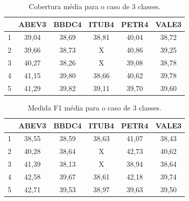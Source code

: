 \documentclass[grad,numbers]{coppe}
\begin{document}
 			\begin{table}[h]
 				\caption{Cobertura média para o caso de 3 classes.}
 				\label{tab:3c_co_analysis}
 				\centering
 				{\footnotesize
 					\begin{tabular}{|c|c|c|c|c|c|}
 						\hline
 						\diagbox[linewidth=0.2pt, width=\dimexpr \textwidth/10+2\tabcolsep\relax, height=0.8cm]{Dias}{Ativo}
 						& ABEV3 & BBDC4 & ITUB4 & PETR4 & VALE3\\
 						\hline
 						1 & 39,04 & 38,69 & 38,81 & 40,04 & 38,72 \\
 						2 & 39,66 & 38,73 & X     & 40,86 & 39,25 \\
 						3 & 40,27 & 38,26 & X     & 39,08 & 38,78 \\
 						4 & 41,15 & 39,80 & 38,66 & 40,62 & 39,78 \\
 						5 & 41,29 & 39,82 & 39,11 & 39,70 & 39,60 \\
 						\hline
 				\end{tabular}}
 			\end{table}
 			\begin{table}[h]
 				\caption{Medida F1 média para o caso de 3 classes.}
 				\label{tab:3c_f1_analysis}
 				\centering
 				{\footnotesize
 					\begin{tabular}{|c|c|c|c|c|c|}
 						\hline
 						\diagbox[linewidth=0.2pt, width=\dimexpr \textwidth/10+2\tabcolsep\relax, height=0.8cm]{Dias}{Ativo}
 						& ABEV3 & BBDC4 & ITUB4 & PETR4 & VALE3\\
 						\hline
 						1 & 38,55 & 38,59 & 38,63 & 41,07 & 38,43 \\
 						2 & 40,28 & 38,64 & X     & 42,73 & 40,62 \\
 						3 & 41,39 & 38,13 & X     & 38,94 & 38,64 \\
 						4 & 42,58 & 39,67 & 38,61 & 42,18 & 39,74 \\
 						5 & 42,71 & 39,53 & 38,97 & 39,63 & 39,50 \\
 						\hline
 				\end{tabular}}
 			\end{table}
 			
\end{document}
